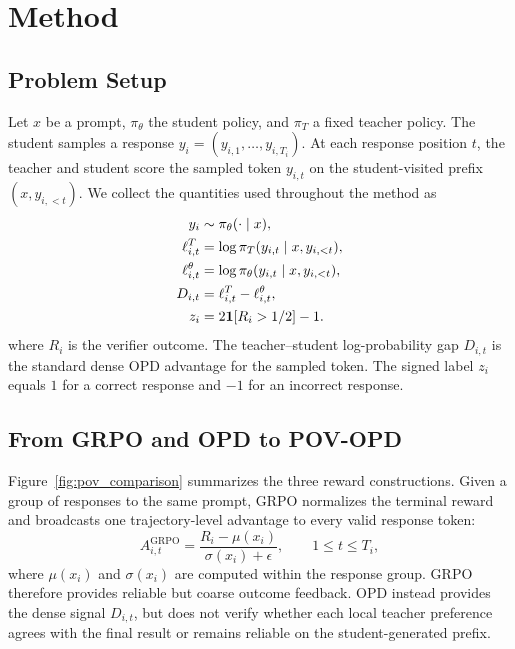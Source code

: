 \section{Method}
\label{sec:method}

\subsection{Problem Setup}

Let $x$ be a prompt, $\pi_\theta$ the student policy, and $\pi_T$ a fixed teacher policy. The student samples a response $y_i=(y_{i,1},\ldots,y_{i,T_i})$. At each response position $t$, the teacher and student score the sampled token $y_{i,t}$ on the student-visited prefix $(x,y_{i,<t})$. We collect the quantities used throughout the method as
\begin{equation}
\begin{aligned}
y_i&\sim\pi_\theta(\cdot\mid x),\\
\ell^T_{i,t}&=\log\pi_T(y_{i,t}\mid x,y_{i,<t}),\\
\ell^\theta_{i,t}&=\log\pi_\theta(y_{i,t}\mid x,y_{i,<t}),\\
D_{i,t}&=\ell^T_{i,t}-\ell^\theta_{i,t},\\
z_i&=2{\bf 1}[R_i>1/2]-1.
\end{aligned}
\label{eq:basic-signals}
\end{equation}
where $R_i$ is the verifier outcome. The teacher--student log-probability gap $D_{i,t}$ is the standard dense OPD advantage for the sampled token. The signed label $z_i$ equals $1$ for a correct response and $-1$ for an incorrect response.

\subsection{From GRPO and OPD to POV-OPD}

Figure~\ref{fig:pov_comparison} summarizes the three reward constructions. Given a group of responses to the same prompt, GRPO normalizes the terminal reward and broadcasts one trajectory-level advantage to every valid response token:
\begin{equation}
A^{\mathrm{GRPO}}_{i,t}
=\frac{R_i-\mu(x_i)}{\sigma(x_i)+\epsilon},
\qquad 1\leq t\leq T_i,
\label{eq:grpo-advantage}
\end{equation}
where $\mu(x_i)$ and $\sigma(x_i)$ are computed within the response group. GRPO therefore provides reliable but coarse outcome feedback. OPD instead provides the dense signal $D_{i,t}$, but does not verify whether each local teacher preference agrees with the final result or remains reliable on the student-generated prefix.

